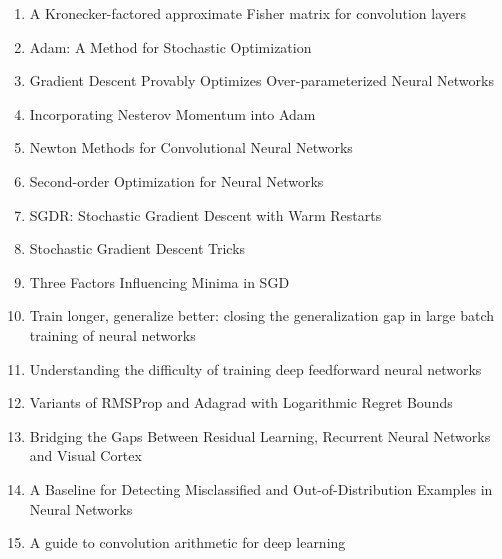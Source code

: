 \documentclass[acmlarge]{acmart}
\begin{document}
\begin{enumerate}
	\item A Kronecker-factored approximate Fisher matrix for convolution layers \cite{Grosse2016AKA} 

	\item Adam: A Method for Stochastic Optimization \cite{kingma2014adam} 

	\item Gradient Descent Provably Optimizes Over-parameterized Neural Networks \cite{Du2019GradientDP} 

	\item Incorporating Nesterov Momentum into Adam \cite{Dozat2016IncorporatingNM} 

	\item Newton Methods for Convolutional Neural Networks \cite{Wang2020NewtonMF} 

	\item Second-order Optimization for Neural Networks \cite{Martens2016SecondorderOF} 

	\item SGDR: Stochastic Gradient Descent with Warm Restarts \cite{Loshchilov2017SGDRSG} 

	\item Stochastic Gradient Descent Tricks \cite{Bottou2012StochasticGD} 

	\item Three Factors Influencing Minima in SGD \cite{Jastrzebski2017ThreeFI} 

	\item Train longer, generalize better: closing the generalization gap in large batch training of neural networks \cite{Hoffer2017TrainLG} 

	\item Understanding the difficulty of training deep feedforward neural networks \cite{Glorot2010UnderstandingTD} 

	\item Variants of RMSProp and Adagrad with Logarithmic Regret Bounds \cite{Mukkamala2017VariantsOR} 

	\item Bridging the Gaps Between Residual Learning, Recurrent Neural Networks and Visual Cortex \cite{Liao2016BridgingTG} 

	\item A Baseline for Detecting Misclassified and Out-of-Distribution Examples in Neural Networks \cite{Hendrycks2017ABF} 

	\item A guide to convolution arithmetic for deep learning \cite{Dumoulin2016AGT} 


\end{enumerate}
\end{document}
